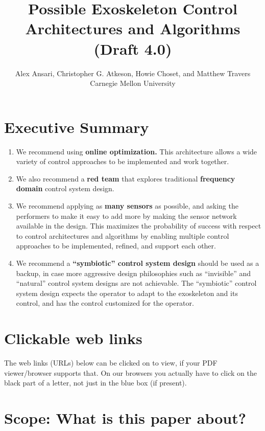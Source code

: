 \documentclass[letterpaper,12pt,fullpage]{article}
\begin{document}
\title{Possible Exoskeleton Control Architectures and Algorithms\\
(Draft 4.0)}

\author{Alex Ansari, Christopher G. Atkeson, Howie Choset, and Matthew Travers\\
Carnegie Mellon University}

\maketitle

\section{Executive Summary}

\begin{enumerate}
\item
We recommend using {\bf online optimization.} This architecture allows
a wide variety of control approaches to be implemented and work together.
\item
We also recommend a {\bf red team} that explores traditional 
{\bf frequency domain} control system
design.
\item
We recommend applying as {\bf many sensors} as possible, and asking the performers
to make it easy to add more by making the sensor network available in the design.
This maximizes the probability of success
with respect to control architectures and algorithms by enabling multiple control
approaches to be implemented, refined, and support each other.
\item
We recommend a {\bf ``symbiotic'' control system design} should be used as a backup,
in case more aggressive design philosophies such as ``invisible'' and ``natural''
control system designs are not achievable.
The ``symbiotic'' control system design
expects the operator to adapt to the exoskeleton and its control,
and has the control customized for the operator.
\end{enumerate}

\section{Clickable web links}

The web links (URLs) below can be clicked on to view, if your PDF viewer/browser supports that. On our browsers you actually have to click on the black
part of a letter, not just in the blue box (if present).

\section{Scope: What is this paper about?}
\end{document}
